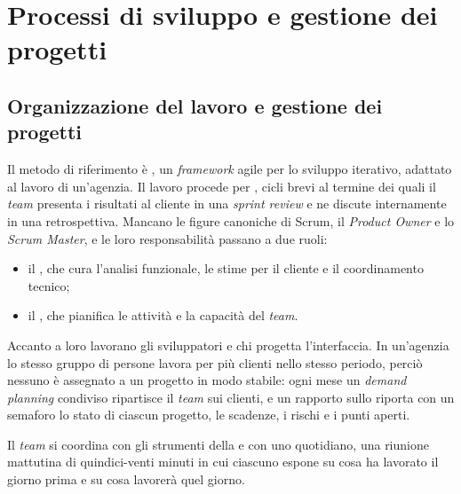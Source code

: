 
\section{Processi di sviluppo e gestione dei progetti}

\subsection{Organizzazione del lavoro e gestione dei progetti}
\label{sec:organizzazione-halue}

Il metodo di riferimento è , un \emph{framework} agile per lo sviluppo
iterativo, adattato al lavoro di un’agenzia. Il lavoro procede per ,
cicli brevi al termine dei quali il \emph{team} presenta i risultati al cliente in una \emph{sprint
review} e ne discute internamente in una retrospettiva. Mancano le figure canoniche di Scrum, il
\emph{Product Owner} e lo \emph{Scrum Master}, e le loro responsabilità passano a due ruoli:

\begin{itemize}
	\item il , che cura l’analisi funzionale, le stime per il
	cliente e il coordinamento tecnico;
	\item il , che pianifica le
	attività e la capacità del \emph{team}.
\end{itemize}

Accanto a loro lavorano gli sviluppatori e chi progetta l’interfaccia. In un’agenzia lo stesso
gruppo di persone lavora per più clienti nello stesso periodo, perciò nessuno è assegnato a un
progetto in modo stabile: ogni mese un \emph{demand planning} condiviso ripartisce il \emph{team}
sui clienti, e un rapporto sullo  riporta con un
semaforo lo stato di ciascun progetto, le scadenze, i rischi e i punti aperti.

Il \emph{team} si coordina con gli strumenti della  e con uno
 quotidiano, una riunione mattutina di quindici-venti minuti in
cui ciascuno espone su cosa ha lavorato il giorno prima e su cosa lavorerà quel giorno.

